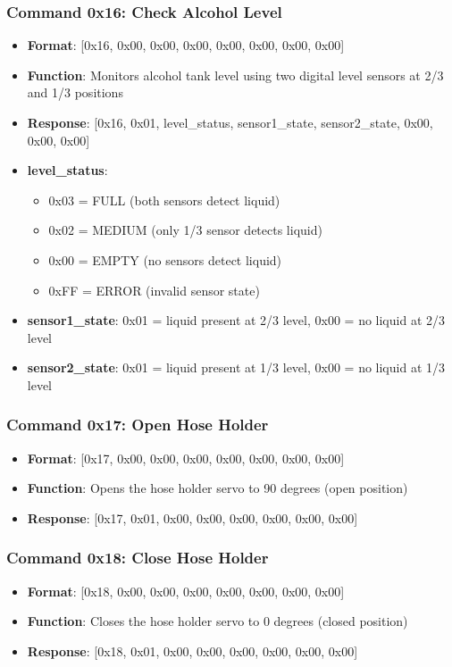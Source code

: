 \documentclass[11pt,a4paper]{article}
\begin{document}
\subsubsection{Command 0x16: Check Alcohol Level}
\begin{itemize}
    \item \textbf{Format}: [0x16, 0x00, 0x00, 0x00, 0x00, 0x00, 0x00, 0x00]
    \item \textbf{Function}: Monitors alcohol tank level using two digital level sensors at 2/3 and 1/3 positions
    \item \textbf{Response}: [0x16, 0x01, level\_status, sensor1\_state, sensor2\_state, 0x00, 0x00, 0x00]
    \item \textbf{level\_status}: 
    \begin{itemize}
        \item 0x03 = FULL (both sensors detect liquid)
        \item 0x02 = MEDIUM (only 1/3 sensor detects liquid)
        \item 0x00 = EMPTY (no sensors detect liquid)
        \item 0xFF = ERROR (invalid sensor state)
    \end{itemize}
    \item \textbf{sensor1\_state}: 0x01 = liquid present at 2/3 level, 0x00 = no liquid at 2/3 level
    \item \textbf{sensor2\_state}: 0x01 = liquid present at 1/3 level, 0x00 = no liquid at 1/3 level
\end{itemize}

\subsubsection{Command 0x17: Open Hose Holder}
\begin{itemize}
    \item \textbf{Format}: [0x17, 0x00, 0x00, 0x00, 0x00, 0x00, 0x00, 0x00]
    \item \textbf{Function}: Opens the hose holder servo to 90 degrees (open position)
    \item \textbf{Response}: [0x17, 0x01, 0x00, 0x00, 0x00, 0x00, 0x00, 0x00]
\end{itemize}

\subsubsection{Command 0x18: Close Hose Holder}
\begin{itemize}
    \item \textbf{Format}: [0x18, 0x00, 0x00, 0x00, 0x00, 0x00, 0x00, 0x00]
    \item \textbf{Function}: Closes the hose holder servo to 0 degrees (closed position)
    \item \textbf{Response}: [0x18, 0x01, 0x00, 0x00, 0x00, 0x00, 0x00, 0x00]
\end{itemize}
\end{document}
